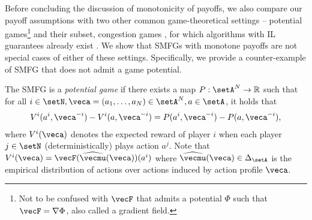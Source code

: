 Before concluding the discussion of monotonicity of payoffs, we also compare our payoff assumptions with two other common game-theoretical settings -- potential games\footnote{Not to be confused with $\vecF$ that admits a potential $\Phi$ such that $\vecF = \nabla \Phi$, also called a gradient field.} \citep{monderer1996potential} and their subset,  congestion games \citep{rosenthal1973class}, for which  algorithms with IL guarantees already exist \citep{leonardos2021global}. 
We show that SMFGs with monotone payoffs are not special cases of either of these settings. Specifically, we provide a counter-example of SMFG that does not admit a game potential.

\begin{remark}
The SMFG is a \emph{potential game} if there exists a map $P: \setA^N \rightarrow \mathbb{R}$ such that for all $i\in\setN, \veca = (a_1, \ldots, a_N) \in \setA^N, a\in\setA$, it holds that
\begin{align}\label{eq:potgame}
    V^{i}(a^i, \veca^{-i}) - V^{i}(a, \veca^{-i}) = P(a^i, \veca^{-i}) - P(a, \veca^{-i}),
\end{align}
where $V^{i}(\veca)$ denotes the expected reward of player $i$ when each player $j \in \setN$ (deterministically) plays action $a^j$.
Note that $V^{i}(\veca) = \vecF(\widehat{\vecmu}(\veca))(a^i)$ where $\widehat{\vecmu}(\veca) \in \Delta_\setA$ is the empirical distribution of actions over actions induced by action profile $\veca$.


\end{remark}
